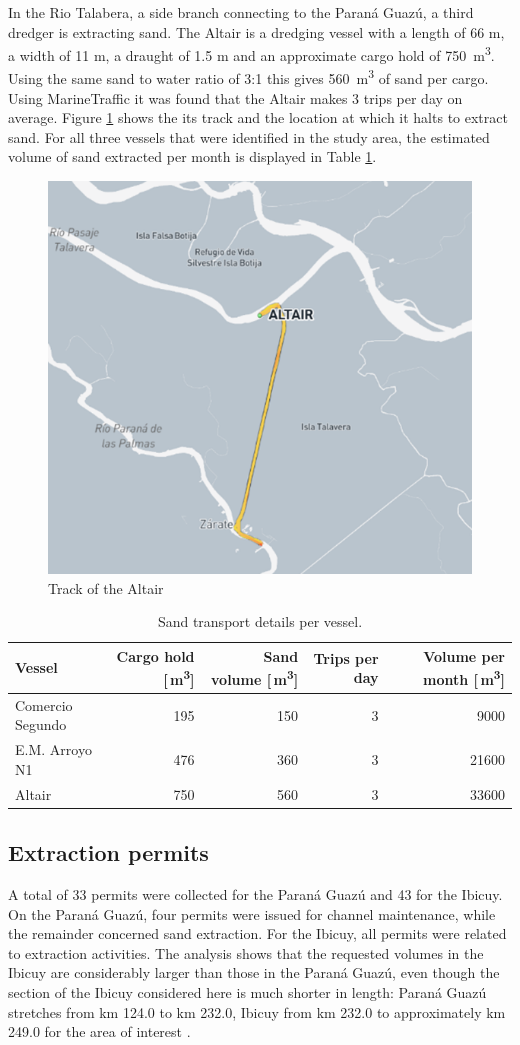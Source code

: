 In the Rio Talabera, a side branch connecting to the Paraná Guazú, a third dredger is extracting sand. The Altair is a dredging vessel with a length of 66 m, a width of 11 m, a draught of 1.5 m and an approximate cargo hold of 750 \,m\textsuperscript{3}. Using the same sand to water ratio of 3:1 this gives 560 \,m\textsuperscript{3} of sand per cargo. Using MarineTraffic it was found that the Altair makes 3 trips per day on average. Figure \ref{fig:Altair_track} shows the its track and the location at which it halts to extract sand. For all three vessels that were identified in the study area, the estimated volume of sand extracted per month is displayed in Table \ref{tab:sand_volume}.

\begin{figure}[H]
    \centering
    \includegraphics[width=0.5\linewidth]{figures/ch5/Track_Altair.png}
    \caption{Track of the Altair}
    \label{fig:Altair_track}
\end{figure}


\begin{table}[h!]
\centering
\begin{tabular}{lrrrr}
\hline
\textbf{Vessel} & \textbf{Cargo hold [\,m\textsuperscript{3}]} & \textbf{Sand volume [\,m\textsuperscript{3}]} & \textbf{Trips per day} & \textbf{Volume per month [\,m\textsuperscript{3}]} \\
\hline
Comercio Segundo & 195 & 150 & 3 & 9000 \\
E.M. Arroyo N1 & 476 & 360 & 3 & 21600 \\
Altair & 750 & 560 & 3 & 33600 \\
\hline
\end{tabular}
\caption{Sand transport details per vessel.}
\label{tab:sand_volume}
\end{table}

\subsection{Extraction permits}
A total of 33 permits were collected for the Paraná Guazú and 43 for the Ibicuy. On the Paraná Guazú, four permits were issued for channel maintenance, while the remainder concerned sand extraction. For the Ibicuy, all permits were related to extraction activities. The analysis shows that the requested volumes in the Ibicuy are considerably larger than those in the Paraná Guazú, even though the section of the Ibicuy considered here is much shorter in length: Paraná Guazú stretches from km 124.0 to km 232.0, Ibicuy from km 232.0 to approximately km 249.0 for the area of interest \autocite{administraciongeneraldepuertoss.a.u.AGPComenzoBatimetria2023}.


